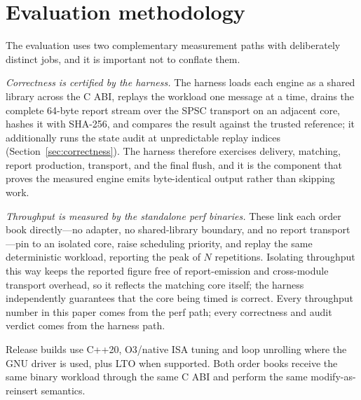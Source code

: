 \documentclass[10pt,twocolumn]{article}
\begin{document}
\section{Evaluation methodology}

The evaluation uses two complementary measurement paths with deliberately
distinct jobs, and it is important not to conflate them.

\emph{Correctness is certified by the harness.}  The harness loads each engine as
a shared library across the C ABI, replays the workload one message at a time,
drains the complete 64-byte report stream over the SPSC transport on an adjacent
core, hashes it with SHA-256, and compares the result against the trusted
reference; it additionally runs the state audit at unpredictable replay indices
(Section~\ref{sec:correctness}).  The harness therefore exercises delivery,
matching, report production, transport, and the final flush, and it is the
component that proves the measured engine emits byte-identical output rather than
skipping work.

\emph{Throughput is measured by the standalone perf binaries.}  These link each
order book directly---no adapter, no shared-library boundary, and no report
transport---pin to an isolated core, raise scheduling priority, and replay the
same deterministic workload, reporting the peak of $N$ repetitions.  Isolating
throughput this way keeps the reported figure free of report-emission and
cross-module transport overhead, so it reflects the matching core itself; the
harness independently guarantees that the core being timed is correct.  Every
throughput number in this paper comes from the perf path; every correctness and
audit verdict comes from the harness path.

Release builds use C++20, O3/native ISA tuning and loop unrolling where the GNU
driver is used, plus LTO when supported.  Both order books receive the same binary
workload through the same C ABI and perform the same modify-as-reinsert semantics.
\end{document}
